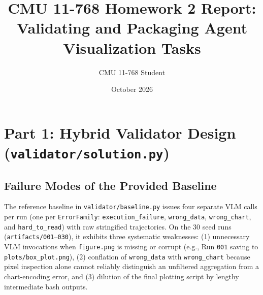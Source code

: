 \documentclass[11pt]{article}
\title{CMU 11-768 Homework 2 Report:\\Validating and Packaging Agent Visualization Tasks}
\author{CMU 11-768 Student}
\date{October 2026}
\begin{document}
\maketitle

\section{Part 1: Hybrid Validator Design (\texttt{validator/solution.py})}

\subsection{Failure Modes of the Provided Baseline}
The reference baseline in \texttt{validator/baseline.py} issues four separate VLM calls per run (one per \texttt{ErrorFamily}: \texttt{execution\_failure}, \texttt{wrong\_data}, \texttt{wrong\_chart}, and \texttt{hard\_to\_read}) with raw stringified trajectories. On the 30 seed runs (\texttt{artifacts/001}--\texttt{030}), it exhibits three systematic weaknesses: (1) unnecessary VLM invocations when \texttt{figure.png} is missing or corrupt (e.g., Run \texttt{001} saving to \texttt{plots/box\_plot.png}), (2) conflation of \texttt{wrong\_data} with \texttt{wrong\_chart} because pixel inspection alone cannot reliably distinguish an unfiltered aggregation from a chart-encoding error, and (3) dilution of the final plotting script by lengthy intermediate bash outputs.
\end{document}
